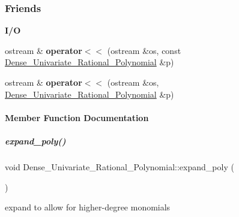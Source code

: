 \subsubsection*{Friends}
\begin{Indent}\textbf{ I/O}\par
\begin{DoxyCompactItemize}
\item 
\mbox{\label{group__polygroup_ac7750eb75a7943bbc34c104cd36333ff}} 
ostream \& {\bfseries operator$<$$<$} (ostream \&os, const \hyperlink{group__polygroup_class_dense___univariate___rational___polynomial}{Dense\+\_\+\+Univariate\+\_\+\+Rational\+\_\+\+Polynomial} \&p)
\item 
\mbox{\label{group__polygroup_a070aa3f629127672cb47c9eec3ec102b}} 
ostream \& {\bfseries operator$<$$<$} (ostream \&os, \hyperlink{group__polygroup_class_dense___univariate___rational___polynomial}{Dense\+\_\+\+Univariate\+\_\+\+Rational\+\_\+\+Polynomial} \&p)
\end{DoxyCompactItemize}
\end{Indent}


\paragraph{Member Function Documentation}
\mbox{\label{group__polygroup_a57f7bbe1cd7ae1c2ca66d12f988a9c6d}} 
\subparagraph{\texorpdfstring{expand\+\_\+poly()}{expand\_poly()}\hspace{0.1cm}{\footnotesize\ttfamily [1/2]}}
{\footnotesize\ttfamily void Dense\+\_\+\+Univariate\+\_\+\+Rational\+\_\+\+Polynomial\+::expand\+\_\+poly (\begin{DoxyParamCaption}\item[{D\+E\+G\+\_\+\+T\+Y\+PE}]{ }\end{DoxyParamCaption})}



expand to allow for higher-\/degree monomials 

